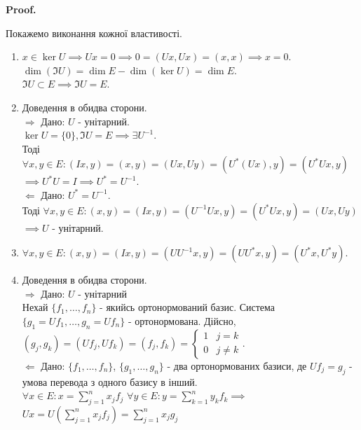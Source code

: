 \documentclass[a4paper, 10pt]{article}
\makeatletter
\def\rightproof{$\boxed{\Rightarrow}$ }
\def\leftproof{$\boxed{\Leftarrow}$ }
\theoremstyle{theoremdd}
\renewenvironment{proof}[1][Proof.\\]{\par
\pushQED{\hfill \qed}%
\normalfont \topsep6\p@\@plus6\p@\relax
\trivlist
\item\relax
{\bfseries
#1\@addpunct{.}}\hspace\labelsep\ignorespaces
}{%
\popQED\endtrivlist\@endpefalse
}
\makeatother
\begin{document}
\begin{proof}
Покажемо виконання кожної властивості.
\begin{enumerate}[topsep=-\parskip, wide=0pt, label={\arabic*)}]
\item $x \in \ker U \implies Ux = 0 \implies 0 = (Ux, Ux) = (x,x) \implies x = 0$.\\
$\dim(\Im U) = \dim E - \dim(\ker U) = \dim E$.\\
$\Im U \subset E \implies \Im U = E$.
\iffalse
\rm{5.7.2.} У випадку дійсного евклідового простору унітарний оператор ще називають ортогонаьним
\bigskip \\
\fi
\item Доведення в обидва сторони.\\
\rightproof Дано: $U$ - унітарний.\\
$\ker U = \{0\}, \Im U = E \implies \exists U^{-1}$.\\
Тоді $\forall x,y \in E: (Ix,y) = (x,y) = (Ux,Uy) = (U^*(Ux), y) = (U^*Ux,y)$\\
$\implies U^* U = I \implies U^* = U^{-1}$.
\bigskip \\
\leftproof Дано: $U^* = U^{-1}$.\\
Тоді $\forall x,y \in E: (x,y) = (Ix, y) = (U^{-1}Ux, y) = (U^*Ux,y) = (Ux, Uy)$\\
$\implies U$ - унітарний.
\item $\forall x,y \in E: (x,y) = (Ix,y) = (UU^{-1}x,y) = (UU^* x,y) = (U^*x,U^*y)$.
\item Доведення в обидва сторони.\\
\rightproof Дано: $U$ - унітарний\\
Нехай $\{f_1,\dots,f_n\}$ - якийсь ортонормований базис. Система $\{g_1 = Uf_1, \dots, g_n = Uf_n\}$ - ортонормована. Дійсно,\\
$(g_j,g_k) = (Uf_j, Uf_k) = (f_j,f_k) = \begin{cases} 1 & j = k \\ 0 & j \neq k \end{cases}$.
\bigskip \\
\leftproof Дано: $\{f_1,\dots,f_n\}$, $\{g_1,\dots,g_n\}$ - два ортонормованих базиси, де $Uf_j = g_j$ - умова перевода з одного базису в інший.\\
$\forall x \in E: x = \displaystyle \sum_{j=1}^n x_j f_j$
\hspace{2.3cm}
$\forall y \in E: y = \displaystyle \sum_{k=1}^n y_k f_k \implies$\\
$Ux = \displaystyle U\left(\sum_{j=1}^n x_j f_j \right) = \sum_{j=1}^n x_j g_j$

\end{enumerate}
\end{proof}
\end{document}
